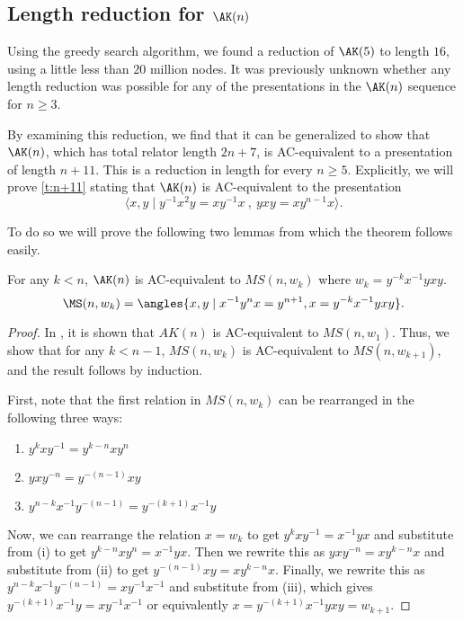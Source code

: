 
\subsection{Length reduction for $\AK(n)$}

Using the greedy search algorithm, we found a reduction of $\AK(5)$ to length $16$, using a little less than $20$ million nodes.
It was previously unknown whether any length reduction was possible for any of the presentations in the $\AK(n)$ sequence for $n \geq 3$.

By examining this reduction, we find that it can be generalized to show that $\AK(n)$, which has total relator length $2n+7$, is AC-equivalent to a presentation of length $n+11$. This is a reduction in length for every $n \geq 5$.
Explicitly, we will prove \autoref{t:n+11} stating that $\AK(n)$ is AC-equivalent to the presentation
\[
\langle x,y \mid y^{-1} x^2 y = x y^{-1} x \ , \ y x y = x y^{n-1} x \rangle.
\]

To do so we will prove the following two lemmas from which the theorem follows easily.

\begin{lemma}
    For any $k<n$, $\AK(n)$ is AC-equivalent to $MS(n, w_k)$ where $w_k = y^{-k} x^{-1} y x y$. 
    \[
\MS(n, w_k) = \angles{x, y \mid x^{-1} y^n x = y^{n+1}, x = y^{-k} x^{-1} y x y}.
\]
\end{lemma}


\begin{proof}
    In \cite{MMS}, it is shown that $AK(n)$ is AC-equivalent to $MS(n, w_1)$. Thus, we show that for any $k<n-1$, $MS(n, w_k)$ is AC-equivalent to $MS(n, w_{k+1})$, and the result follows by induction.

    First, note that the first relation in $MS(n, w_k)$ can be rearranged in the following three ways:
    \begin{enumerate}[label=(\roman*)]
        \item $y^kxy^{-1}=y^{k-n}xy^n$
        \item $yxy^{-n}=y^{-(n-1)}xy$
        \item $y^{n-k}x^{-1}y^{-(n-1)}=y^{-(k+1)}x^{-1}y$
    \end{enumerate}

    Now, we can rearrange the relation $x=w_k$ to get $y^k x y^{-1}=x^{-1}yx$ and substitute from (i) to get $y^{k-n} x y^n = x^{-1}yx$. Then we rewrite this as $yxy^{-n}=xy^{k-n}x$ and substitute from (ii) to get $ y^{-(n-1)}xy= xy^{k-n}x$. Finally, we rewrite this as $y^{n-k}x^{-1}y^{-(n-1)}=xy^{-1}x^{-1}$ and substitute from (iii), which gives $y^{-(k+1)}x^{-1}y=xy^{-1}x^{-1}$ or equivalently $x=y^{-(k+1)}x^{-1}yxy=w_{k+1}$. 
\end{proof}

